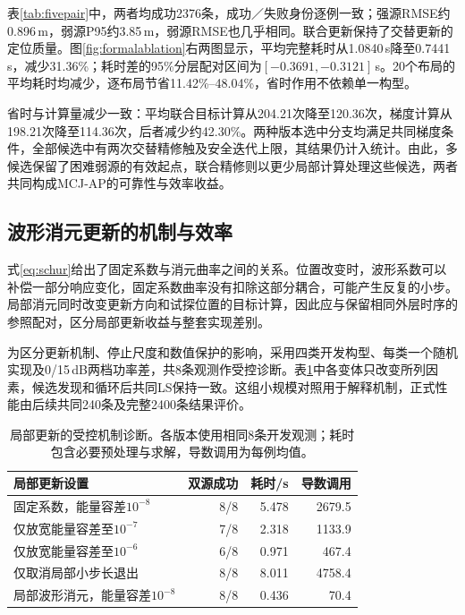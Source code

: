 \documentclass[a4paper,fleqn]{cas-sc}
\numberwithin{equation}{section}
\numberwithin{figure}{section}
\numberwithin{table}{section}
\begin{document}
表\ref{tab:fivepair}中，两者均成功2376条，成功／失败身份逐例一致；强源RMSE约0.896\,m，弱源P95约3.85\,m，弱源RMSE也几乎相同。联合更新保持了交替更新的定位质量。图\ref{fig:formalablation}右两图显示，平均完整耗时从1.0840\,s降至0.7441\,s，减少31.36\%；耗时差的95\%分层配对区间为$[-0.3691,-0.3121]$\,s。20个布局的平均耗时均减少，逐布局节省11.42\%--48.04\%，省时作用不依赖单一构型。

省时与计算量减少一致：平均联合目标计算从204.21次降至120.36次，梯度计算从198.21次降至114.36次，后者减少约42.30\%。两种版本选中分支均满足共同梯度条件，全部候选中有两次交替精修触及安全迭代上限，其结果仍计入统计。由此，多候选保留了困难弱源的有效起点，联合精修则以更少局部计算处理这些候选，两者共同构成MCJ-AP的可靠性与效率收益。

\FloatBarrier
\subsection{波形消元更新的机制与效率}\label{sec:mechanismresults}
式\eqref{eq:schur}给出了固定系数与消元曲率之间的关系。位置改变时，波形系数可以补偿一部分响应变化，固定系数曲率没有扣除这部分耦合，可能产生反复的小步。局部消元同时改变更新方向和试探位置的目标计算，因此应与保留相同外层时序的参照配对，区分局部更新收益与整套实现差别。

为区分更新机制、停止尺度和数值保护的影响，采用四类开发构型、每类一个随机实现及0/15\,dB两档功率差，共8条观测作受控诊断。表\ref{tab:mechanism}中各变体只改变所列因素，候选发现和循环后共同LS保持一致。这组小规模对照用于解释机制，正式性能由后续共同240条及完整2400条结果评价。

\begin{table}[pos=H]\centering\small
\caption{局部更新的受控机制诊断。各版本使用相同8条开发观测；耗时包含必要预处理与求解，导数调用为每例均值。}\label{tab:mechanism}
\begin{tabular}{@{}lrrr@{}}\toprule
局部更新设置 & 双源成功 & 耗时/s & 导数调用\\\midrule
固定系数，能量容差$10^{-8}$ & 8/8 & 5.478 & 2679.5\\
仅放宽能量容差至$10^{-7}$ & 7/8 & 2.318 & 1133.9\\
仅放宽能量容差至$10^{-6}$ & 6/8 & 0.971 & 467.4\\
仅取消局部小步长退出 & 8/8 & 8.011 & 4758.4\\
局部波形消元，能量容差$10^{-8}$ & 8/8 & 0.436 & 70.4\\\bottomrule
\end{tabular}\end{table}
\end{document}
